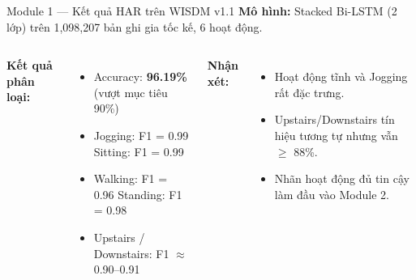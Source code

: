 \documentclass[11pt]{beamer}
\begin{document}
\begin{frame}{Module 1 --- Kết quả HAR trên WISDM v1.1}
\small
\textbf{Mô hình:} Stacked Bi-LSTM (2 lớp) trên 1,098,207 bản ghi gia tốc kế, 6 hoạt động.

\vspace{0.15cm}
\begin{columns}[T]
\textbf{Kết quả phân loại:}
\begin{itemize}
    \item Accuracy: \textbf{96.19\%} (vượt mục tiêu 90\%)
    \item Jogging: F1 = 0.99 \quad Sitting: F1 = 0.99
    \item Walking: F1 = 0.96 \quad Standing: F1 = 0.98
    \item Upstairs / Downstairs: F1 $\approx$ 0.90--0.91
\end{itemize}

\textbf{Nhận xét:}
\begin{itemize}
    \item Hoạt động tĩnh và Jogging rất đặc trưng.
    \item Upstairs/Downstairs tín hiệu tương tự nhưng vẫn $\geq$ 88\%.
    \item Nhãn hoạt động đủ tin cậy làm đầu vào Module 2.
\end{itemize}
\end{columns}

\vspace{0.15cm}
\end{frame}

\end{document}
